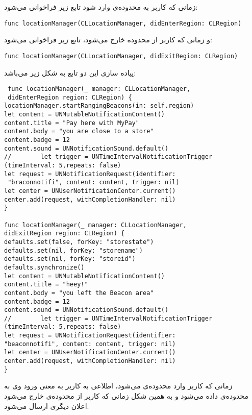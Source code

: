 \documentclass[oneside]{report}
\begin{document}
زمانی که کاربر به محدوده‌ی 
	{\normalsize {}}
	وارد شود تابع زیر فراخوانی می‌شود: 
	\begin{latin}
		\begin{verbatim}
func locationManager(CLLocationManager, didEnterRegion: CLRegion)
		\end{verbatim}
		
\end{latin}	
و زمانی که کاربر از محدوده خارج می‌شود، تابع زیر فراخوانی می‌شود: 
\begin{latin}
	\begin{verbatim}
func locationManager(CLLocationManager, didExitRegion: CLRegion)
	\end{verbatim}
\end{latin}	
	پیاده سازی این دو تابع به شکل زیر می‌باشد: 
	\begin{latin}
		\begin{verbatim}
 func locationManager(_ manager: CLLocationManager, 
 didEnterRegion region: CLRegion) {
locationManager.startRangingBeacons(in: self.region)
let content = UNMutableNotificationContent()
content.title = "Pay here with MyPay"
content.body = "you are close to a store"
content.badge = 12
content.sound = UNNotificationSound.default()
//        let trigger = UNTimeIntervalNotificationTrigger
(timeInterval: 5,repeats: false)
let request = UNNotificationRequest(identifier:
 "braconnotifi", content: content, trigger: nil)
let center = UNUserNotificationCenter.current()
center.add(request, withCompletionHandler: nil)
}

func locationManager(_ manager: CLLocationManager, 
didExitRegion region: CLRegion) {
defaults.set(false, forKey: "storestate")
defaults.set(nil, forKey: "storename")
defaults.set(nil, forKey: "storeid")
defaults.synchronize()
let content = UNMutableNotificationContent()
content.title = "heey!"
content.body = "you left the Beacon area"
content.badge = 12
content.sound = UNNotificationSound.default()
//        let trigger = UNTimeIntervalNotificationTrigger
(timeInterval: 5,repeats: false)
let request = UNNotificationRequest(identifier: 
"beaconnotifi", content: content, trigger: nil)
let center = UNUserNotificationCenter.current()
center.add(request, withCompletionHandler: nil)
}
		\end{verbatim}
	\end{latin}	
	زمانی که کاربر وارد محدوده‌ی 
		{\normalsize {}}
		می‌شود، اطلاعی به کاربر به معنی ورود وی به محدوده‌ی 
			{\normalsize {}}
			داده می‌شود و به همین شکل زمانی که کاربر از محدوده‌ی 
				{\normalsize {}}
				خارج می‌شود اعلان دیگری ارسال می‌شود. 
				
\end{document}
